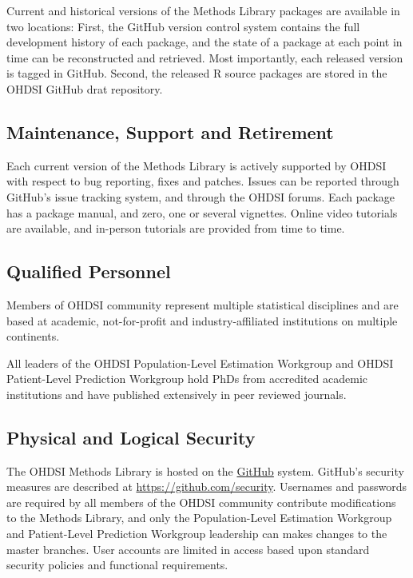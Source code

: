 \documentclass[11pt]{book}
\begin{document}
Current and historical versions of the Methods Library packages are
available in two locations: First, the GitHub version control system
contains the full development history of each package, and the state of
a package at each point in time can be reconstructed and retrieved. Most
importantly, each released version is tagged in GitHub. Second, the
released R source packages are stored in the OHDSI GitHub drat
repository.

\subsection{Maintenance, Support and
Retirement}\label{maintenance-support-and-retirement}

Each current version of the Methods Library is actively supported by
OHDSI with respect to bug reporting, fixes and patches. Issues can be
reported through GitHub's issue tracking system, and through the OHDSI
forums. Each package has a package manual, and zero, one or several
vignettes. Online video tutorials are available, and in-person tutorials
are provided from time to time.

\subsection{Qualified Personnel}\label{qualified-personnel}

Members of OHDSI community represent multiple statistical disciplines
and are based at academic, not-for-profit and industry-affiliated
institutions on multiple continents.

All leaders of the OHDSI Population-Level Estimation Workgroup and OHDSI
Patient-Level Prediction Workgroup hold PhDs from accredited academic
institutions and have published extensively in peer reviewed journals.

\subsection{Physical and Logical
Security}\label{physical-and-logical-security}

The OHDSI Methods Library is hosted on the
\href{https://github.com/}{GitHub} system. GitHub's security measures
are described at \url{https://github.com/security}. Usernames and
passwords are required by all members of the OHDSI community contribute
modifications to the Methods Library, and only the Population-Level
Estimation Workgroup and Patient-Level Prediction Workgroup leadership
can makes changes to the master branches. User accounts are limited in
access based upon standard security policies and functional
requirements.
\end{document}
